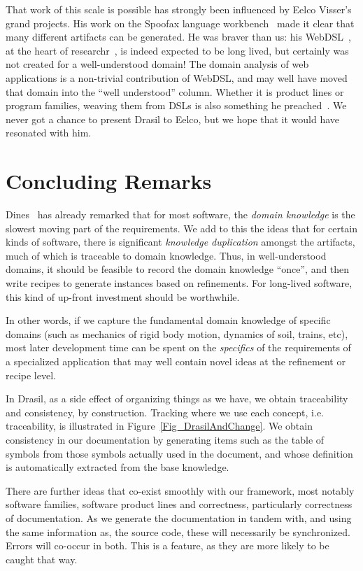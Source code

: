 \documentclass[a4paper,UKenglish,cleveref,autoref,thm-restate]{oasics-v2021}
\begin{document}
That work of this scale is possible has strongly been influenced by Eelco
Visser's grand projects. His work on the Spoofax language workbench~\cite{Spoofax}
made it clear that many different artifacts can be generated. He was braver than
us: his WebDSL~\cite{WebDSL}, at the heart of researchr~\cite{researchr}, is
indeed expected to be long lived, but certainly was not created for a
well-understood domain! The domain analysis of web applications is a non-trivial
contribution of WebDSL, and may well have moved that domain into the ``well understood''
column. Whether it is product lines or program families, weaving
them from DSLs is also something he preached~\cite{voelter2011product}.
We never got a chance to present Drasil to Eelco, but we hope that it would
have resonated with him.

\section{Concluding Remarks}
\label{sec:concluding-remarks}

Dines~\cite{bjorner2021domaineng} has already remarked that for most software,
the \emph{domain knowledge} is the slowest moving part of the requirements.
We add to this the ideas that for certain kinds of software, there is significant
\emph{knowledge duplication} amongst the artifacts, much of which is traceable
to domain knowledge. Thus, in well-understood domains, it should be feasible to
record the domain knowledge ``once'', and then write recipes to generate
instances based on refinements. For long-lived software, this kind of up-front
investment should be worthwhile.

In other words, if we capture the fundamental domain knowledge of specific
domains (such as mechanics of rigid body motion, dynamics of soil, trains,
etc), most later development time can be spent on the \emph{specifics} of the
requirements of a specialized application that may well contain novel ideas at
the refinement or recipe level.

In Drasil, as a side effect of organizing things as we have, we obtain
traceability and consistency, by construction.  Tracking where we use each
concept, i.e. traceability, is illustrated in Figure~\ref{Fig_DrasilAndChange}.
We obtain consistency in our documentation by generating items such as the
table of symbols from those symbols actually used in the document, and whose
definition is automatically extracted from the base knowledge.

There are further ideas that co-exist smoothly with our framework, most notably
software families, software product lines and correctness, particularly
correctness of documentation.  As we generate the documentation in tandem with,
and using the same information as, the source code, these will necessarily be
synchronized. Errors will co-occur in both.  This is a feature, as they are
more likely to be caught that way.
\end{document}
